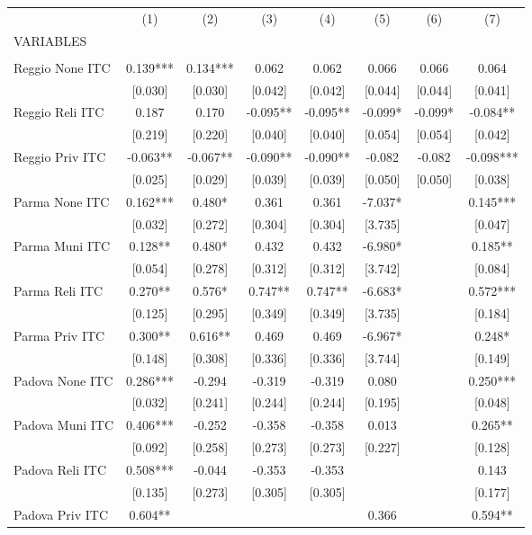 \begin{tabular}{lccccccc} \hline
 & (1) & (2) & (3) & (4) & (5) & (6) & (7) \\
VARIABLES &  &  &  &  &  &  &  \\ \hline
 &  &  &  &  &  &  &  \\
Reggio None ITC & 0.139*** & 0.134*** & 0.062 & 0.062 & 0.066 & 0.066 & 0.064 \\
 & [0.030] & [0.030] & [0.042] & [0.042] & [0.044] & [0.044] & [0.041] \\
Reggio Reli ITC & 0.187 & 0.170 & -0.095** & -0.095** & -0.099* & -0.099* & -0.084** \\
 & [0.219] & [0.220] & [0.040] & [0.040] & [0.054] & [0.054] & [0.042] \\
Reggio Priv ITC & -0.063** & -0.067** & -0.090** & -0.090** & -0.082 & -0.082 & -0.098*** \\
 & [0.025] & [0.029] & [0.039] & [0.039] & [0.050] & [0.050] & [0.038] \\
Parma None ITC & 0.162*** & 0.480* & 0.361 & 0.361 & -7.037* &  & 0.145*** \\
 & [0.032] & [0.272] & [0.304] & [0.304] & [3.735] &  & [0.047] \\
Parma Muni ITC & 0.128** & 0.480* & 0.432 & 0.432 & -6.980* &  & 0.185** \\
 & [0.054] & [0.278] & [0.312] & [0.312] & [3.742] &  & [0.084] \\
Parma Reli ITC & 0.270** & 0.576* & 0.747** & 0.747** & -6.683* &  & 0.572*** \\
 & [0.125] & [0.295] & [0.349] & [0.349] & [3.735] &  & [0.184] \\
Parma Priv ITC & 0.300** & 0.616** & 0.469 & 0.469 & -6.967* &  & 0.248* \\
 & [0.148] & [0.308] & [0.336] & [0.336] & [3.744] &  & [0.149] \\
Padova None ITC & 0.286*** & -0.294 & -0.319 & -0.319 & 0.080 &  & 0.250*** \\
 & [0.032] & [0.241] & [0.244] & [0.244] & [0.195] &  & [0.048] \\
Padova Muni ITC & 0.406*** & -0.252 & -0.358 & -0.358 & 0.013 &  & 0.265** \\
 & [0.092] & [0.258] & [0.273] & [0.273] & [0.227] &  & [0.128] \\
Padova Reli ITC & 0.508*** & -0.044 & -0.353 & -0.353 &  &  & 0.143 \\
 & [0.135] & [0.273] & [0.305] & [0.305] &  &  & [0.177] \\
Padova Priv ITC & 0.604** &  &  &  & 0.366 &  & 0.594** \\

\end{tabular}
